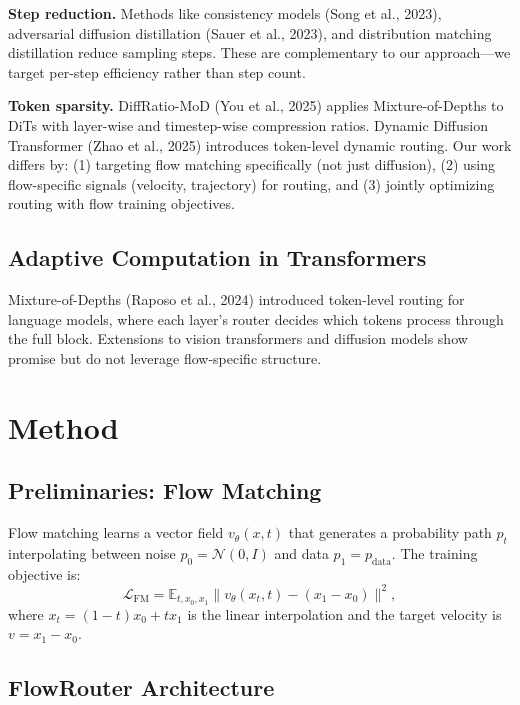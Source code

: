 \documentclass{article}
\begin{document}
\textbf{Step reduction.} Methods like consistency models (Song et al., 2023), adversarial diffusion distillation (Sauer et al., 2023), and distribution matching distillation reduce sampling steps. These are complementary to our approach---we target per-step efficiency rather than step count.

\textbf{Token sparsity.} DiffRatio-MoD (You et al., 2025) applies Mixture-of-Depths to DiTs with layer-wise and timestep-wise compression ratios. Dynamic Diffusion Transformer (Zhao et al., 2025) introduces token-level dynamic routing. Our work differs by: (1) targeting flow matching specifically (not just diffusion), (2) using flow-specific signals (velocity, trajectory) for routing, and (3) jointly optimizing routing with flow training objectives.

\subsection{Adaptive Computation in Transformers}

Mixture-of-Depths (Raposo et al., 2024) introduced token-level routing for language models, where each layer's router decides which tokens process through the full block. Extensions to vision transformers and diffusion models show promise but do not leverage flow-specific structure.

\section{Method}
\label{sec:method}

\subsection{Preliminaries: Flow Matching}

Flow matching learns a vector field $v_\theta(x, t)$ that generates a probability path $p_t$ interpolating between noise $p_0 = \mathcal{N}(0, I)$ and data $p_1 = p_{\text{data}}$. The training objective is:
\begin{equation}
\mathcal{L}_{\text{FM}} = \mathbb{E}_{t, x_0, x_1} \|v_\theta(x_t, t) - (x_1 - x_0)\|^2,
\end{equation}
where $x_t = (1-t)x_0 + tx_1$ is the linear interpolation and the target velocity is $v = x_1 - x_0$.

\subsection{FlowRouter Architecture}
\end{document}
